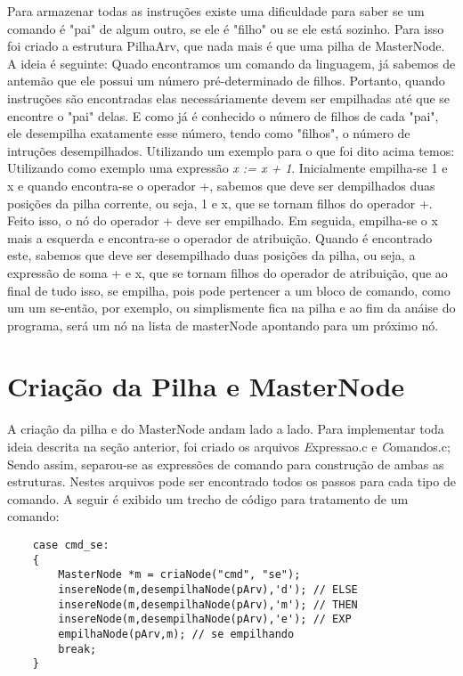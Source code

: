 \documentclass[a4paper,10pt]{article}
\begin{document}
	Para armazenar todas as instruções existe uma dificuldade para saber se um comando é "pai" de algum outro, se ele é "filho" ou se ele está
	sozinho. Para isso foi criado a estrutura PilhaArv, que nada mais é que uma pilha de MasterNode. A ideia é seguinte: Quado encontramos um
	comando da linguagem, já sabemos de antemão que ele possui um número pré-determinado de filhos. Portanto, quando instruções são encontradas
	elas necessáriamente devem ser empilhadas até que se encontre o "pai" delas. E como já é conhecido o número de filhos de cada "pai", ele 
	desempilha exatamente esse número, tendo como "filhos", o número de intruções desempilhados. Utilizando um exemplo para o que foi dito acima
	temos:\\
	Utilizando como exemplo uma expressão \textit {x := x + 1}. Inicialmente empilha-se 1 e x e quando encontra-se o operador +, sabemos que deve
	ser dempilhados duas posições da pilha corrente, ou seja, 1 e x, que se tornam filhos do operador +. Feito isso, o nó do operador + deve ser
	empilhado. Em seguida, empilha-se o x mais a esquerda e encontra-se o operador de atribuição. Quando é encontrado este, sabemos que deve ser
	desempilhado duas posições da pilha, ou seja, a expressão de soma + e x, que se tornam filhos do operador de atribuição, que ao final de 
	tudo isso, se empilha, pois pode pertencer a um bloco de comando, como um um se-então, por exemplo, ou simplismente fica na pilha e ao fim
	da anáise do programa, será um nó na lista de masterNode apontando para um próximo nó.
	\\
	
\section{Criação da Pilha e MasterNode}
	A criação da pilha e do MasterNode andam lado a lado. Para implementar toda ideia descrita na seção anterior, foi criado os arquivos 
	\textit Expressao.c e \textit Comandos.c; Sendo assim, separou-se as expressões de comando para construção de ambas as estruturas.
	Nestes arquivos pode ser encontrado todos os passos para cada tipo de comando. A seguir é exibido um trecho de código para tratamento de
	um comando:
	
\begin{verbatim}
    case cmd_se: 
    {
        MasterNode *m = criaNode("cmd", "se");
        insereNode(m,desempilhaNode(pArv),'d');	// ELSE
        insereNode(m,desempilhaNode(pArv),'m'); // THEN
        insereNode(m,desempilhaNode(pArv),'e'); // EXP
        empilhaNode(pArv,m); // se empilhando
        break;
    }
\end{verbatim}
\end{document}
